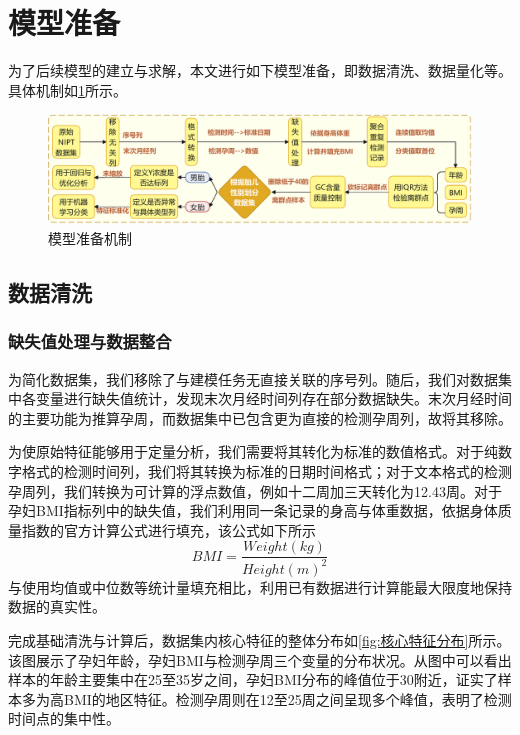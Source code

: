 \section{模型准备}

为了后续模型的建立与求解，本文进行如下模型准备，即数据清洗、数据量化等。具体机制如\cref{fig:模型准备机制}所示。

\begin{figure}[h!]
\centering
\includegraphics[width=1\textwidth]{figs/2模型准备/模型准备.pdf}
\caption{模型准备机制}
\label{fig:模型准备机制}
\end{figure}

\subsection{数据清洗}

\subsubsection{缺失值处理与数据整合}
为简化数据集，我们移除了与建模任务无直接关联的序号列。随后，我们对数据集中各变量进行缺失值统计，发现末次月经时间列存在部分数据缺失。末次月经时间的主要功能为推算孕周，而数据集中已包含更为直接的检测孕周列，故将其移除。

为使原始特征能够用于定量分析，我们需要将其转化为标准的数值格式。对于纯数字格式的检测时间列，我们将其转换为标准的日期时间格式；对于文本格式的检测孕周列，我们转换为可计算的浮点数值，例如十二周加三天转化为12.43周。对于孕妇BMI指标列中的缺失值，我们利用同一条记录的身高与体重数据，依据身体质量指数的官方计算公式进行填充，该公式如下所示
\begin{equation}
BMI = \frac{Weight(kg)}{Height(m)^2}
\label{eq:bmi}
\end{equation}
与使用均值或中位数等统计量填充相比，利用已有数据进行计算能最大限度地保持数据的真实性。

完成基础清洗与计算后，数据集内核心特征的整体分布如\cref{fig:核心特征分布}所示。该图展示了孕妇年龄，孕妇BMI与检测孕周三个变量的分布状况。从图中可以看出样本的年龄主要集中在25至35岁之间，孕妇BMI分布的峰值位于30附近，证实了样本多为高BMI的地区特征。检测孕周则在12至25周之间呈现多个峰值，表明了检测时间点的集中性。

